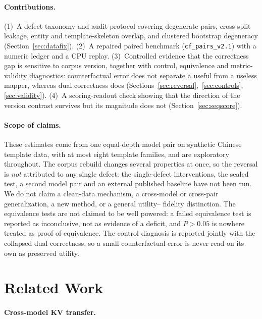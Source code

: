\documentclass[11pt,a4paper]{article}
\begin{document}
\paragraph{Contributions.}

(1)~A defect taxonomy and audit protocol covering degenerate pairs,
cross-split leakage, entity and template-skeleton overlap, and clustered
bootstrap degeneracy (Section~\ref{sec:datafix}). (2)~A repaired paired
benchmark (\texttt{cf\_pairs\_v2.1}) with a numeric ledger and a CPU replay.
(3)~Controlled evidence that the correctness gap is sensitive to corpus
version, together with control, equivalence and metric-validity diagnostics:
counterfactual error does not separate a useful from a useless mapper, whereas
dual correctness does (Sections~\ref{sec:reversal},~\ref{sec:controls},
\ref{sec:validity}). (4)~A scoring-readout check showing that the direction of
the version contrast survives but its magnitude does not
(Section~\ref{sec:seqscore}).

\paragraph{Scope of claims.}

These estimates come from one equal-depth model pair on synthetic Chinese
template data, with at most eight template families, and are exploratory
throughout. The corpus rebuild changes several properties at once, so the
reversal is \emph{not} attributed to any single defect: the single-defect
interventions, the sealed test, a second model pair and an external published
baseline have not been run. We do not claim a clean-data mechanism, a
cross-model or cross-pair generalization, a new method, or a general utility--
fidelity distinction. The equivalence tests are not claimed to be well
powered: a failed equivalence test is reported as inconclusive, not as evidence
of a deficit, and $P>0.05$ is nowhere treated as proof of equivalence. The
control diagnosis is reported jointly with the collapsed dual correctness, so a
small counterfactual error is never read on its own as preserved utility.

\section{Related Work}
\label{sec:related}

\paragraph{Cross-model KV transfer.}
\end{document}
